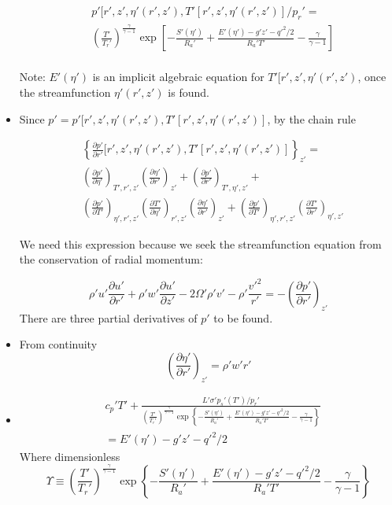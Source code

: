 \documentclass[preprint, prX]{revtex4}
\newcommand{\gogmo}{\frac{\gamma}{\gamma-1}}
\newcommand{\pfrac}[2]{\left(\frac{#1}{#2}\right)}
\newcommand{\pd}[2]{\frac{\partial#1}{\partial#2}}
\newcommand{\tpd}[3]{\left( \frac{\partial#1}{\partial#2} \right)_{#3}}
\begin{document}
\begin{itemize}
\begin{equation}
\begin{split}
&p'[r',z',\eta'(r',z'), T'[r',z',\eta'(r',z')]/p_r' =  \\
&\left( \frac{T'}{T_r'}\right)^\gogmo \exp \left[ -\frac{S'(\eta')}{R_a'}+ \frac{E'(\eta') - g'z' - q'^2/2}{R_a' T'} - \gogmo	\right] \\
\end{split}
\end{equation}

Note: $E'(\eta')$ is an implicit algebraic equation for $T'[r',z',\eta'(r',z')$, once the streamfunction $\eta'(r',z')$ is found.

\item Since $p' = p'[r',z',\eta'(r',z'), T'[r',z',\eta'(r',z')]$, by the chain rule

\begin{equation}
\begin{split}
&\left \{ \pd{ p'}{ r'} [r',z',\eta'(r',z'), T'[r',z',\eta'(r',z')]\right \}_{z'} =\\
& \tpd{ p'}{ \eta'}{T', r', z'}\tpd{ \eta'}{ r'}{z'}+\tpd{ p'}{ r'}{T', \eta', z'}+\\
& \tpd{ p'}{ T'}{\eta', r',z'}\tpd{ T'}{ \eta'}{r',z'}\tpd{ \eta'}{ r'}{z'}+\tpd{ p'}{ T'}{\eta', r',z'} \tpd{ T'}{ r'}{\eta',z'}
\end{split}
\end{equation}

We need this expression because we seek the streamfunction equation from the conservation of radial momentum:

\begin{equation}
	\rho'u'\pd{ u'}{ r'} + \rho'w' \pd{ u'}{ z'} - 2 \Omega' \rho'v' - \rho' \frac{v'^2}{r'} = -\tpd{ p'}{ r'}{z'}
\end{equation}
There are three partial derivatives of $p'$ to be found.

\item From continuity
\begin{equation}
\tpd{ \eta'}{ r'}{z'} = \rho' w' r'
\end{equation}
\item
\begin{equation}
\begin{split}
	&c_p' T' + \frac{L' \sigma' p_s'(T')/p_r'}{\pfrac{T'}{T_r'}^\gogmo \exp \left\{ -\frac{S'(\eta')}{R_a'} + \frac{E'(\eta') - g'z' - q'^2/2}{R_a'T'} - \gogmo \right\}} \\
	& = E'(\eta') - g'z' - q'^2/2
	\end{split}
\end{equation}
Where dimensionless
\begin{equation}
\Upsilon \equiv \pfrac{T'}{T_r'}^\gogmo \exp \left\{ -\frac{S'(\eta')}{R_a'} + \frac{E'(\eta') - g'z' - q'^2/2}{R_a'T'} - \gogmo \right\}
\end{equation}


\end{itemize}
\end{document}
